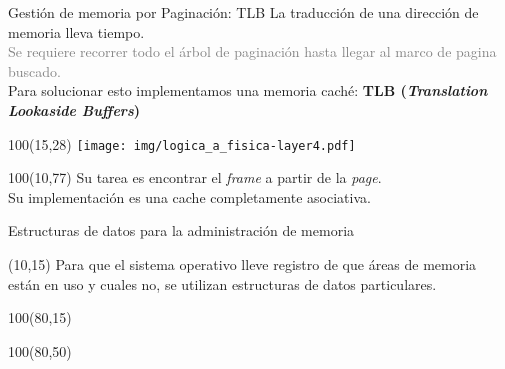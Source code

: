 \documentclass[aspectratio=169]{beamer}
\begin{document}
\begin{frame}[t]{Gestión de memoria por Paginación: TLB}
    \small
    La traducción de una dirección de memoria lleva tiempo.\\
    \textcolor{gray}{Se requiere recorrer todo el árbol de paginación hasta llegar al marco de pagina buscado.}\\
    \medskip
    Para solucionar esto implementamos una memoria caché: \textcolor{naranjauca}{\textbf{TLB (\emph{Translation Lookaside Buffers})}}\\
    \begin{textblock}{100}(15,28)
    \texttt{[image: img/logica\_a\_fisica-layer4.pdf]}
    \end{textblock}
    \begin{textblock}{100}(10,77)
    Su tarea es encontrar el \emph{frame} a partir de la \emph{page}.\\
    Su implementación es una cache completamente asociativa.
    \end{textblock}
\end{frame}

\begin{frame}{Estructuras de datos para la administración de memoria}
    \begin{textblock}{65}(10,15)
    \small
    Para que el sistema operativo lleve registro de que áreas de memoria están en uso y cuales no, se utilizan estructuras de datos particulares.\\
    \vspace{0.7cm}
    \bigskip
    \end{textblock}
    \begin{textblock}{100}(80,15)
    \end{textblock}
    \begin{textblock}{100}(80,50)
    \end{textblock}
\end{frame}
\end{document}
